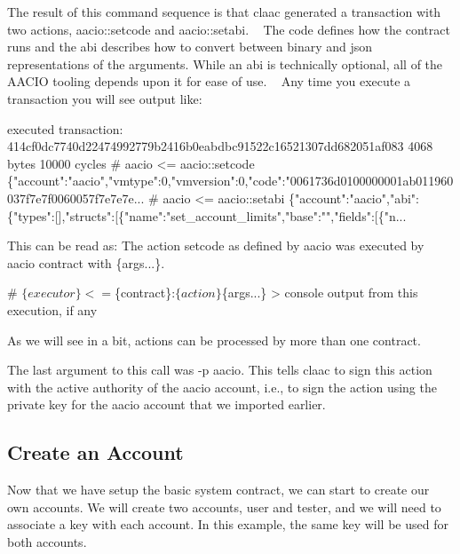 The result of this command sequence is that {\ttfamily claac} generated a transaction with two actions, {\ttfamily aacio\+::setcode} and {\ttfamily aacio\+::setabi}. ~\newline
 The code defines how the contract runs and the abi describes how to convert between binary and json representations of the arguments. While an abi is technically optional, all of the A\+A\+C\+IO tooling depends upon it for ease of use. ~\newline
 Any time you execute a transaction you will see output like\+: 
\begin{DoxyCode}
executed transaction: 414cf0dc7740d22474992779b2416b0eabdbc91522c16521307dd682051af083  4068 bytes  10000
       cycles
#         aacio <= aacio::setcode              
       \{"account":"aacio","vmtype":0,"vmversion":0,"code":"0061736d0100000001ab011960037f7e7f0060057f7e7e7e...
#         aacio <= aacio::setabi               
       \{"account":"aacio","abi":\{"types":[],"structs":[\{"name":"set\_account\_limits","base":"","fields":[\{"n...
\end{DoxyCode}


This can be read as\+: The action {\ttfamily setcode} as defined by {\ttfamily aacio} was executed by {\ttfamily aacio} contract with {\ttfamily \{args...\}}.


\begin{DoxyCode}
#         $\{executor\} <= $\{contract\}:$\{action\} $\{args...\}
> console output from this execution, if any
\end{DoxyCode}


As we will see in a bit, actions can be processed by more than one contract.

The last argument to this call was {\ttfamily -\/p aacio}. This tells {\ttfamily claac} to sign this action with the active authority of the {\ttfamily aacio} account, i.\+e., to sign the action using the private key for the {\ttfamily aacio} account that we imported earlier.

\subsection*{Create an Account}

Now that we have setup the basic system contract, we can start to create our own accounts. We will create two accounts, {\ttfamily user} and {\ttfamily tester}, and we will need to associate a key with each account. In this example, the same key will be used for both accounts.

